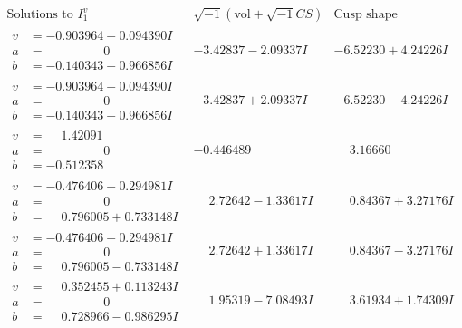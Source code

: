 \documentclass[1p]{elsarticle_modified}
\theoremstyle{definition}
\newcommand{\I}{\sqrt{-1}}
\begin{document}
$$\begin{array}{c|c|c}  
\text{Solutions to }I^v_{1}& \I (\text{vol} + \sqrt{-1}CS) & \text{Cusp shape}\\
 \hline 
\begin{aligned}
v &= -0.903964 + 0.094390 I \\
a &= \phantom{-0.000000 } 0 \\
b &= -0.140343 + 0.966856 I\end{aligned}
 & -3.42837 - 2.09337 I & -6.52230 + 4.24226 I \\ \hline\begin{aligned}
v &= -0.903964 - 0.094390 I \\
a &= \phantom{-0.000000 } 0 \\
b &= -0.140343 - 0.966856 I\end{aligned}
 & -3.42837 + 2.09337 I & -6.52230 - 4.24226 I \\ \hline\begin{aligned}
v &= \phantom{-}1.42091\phantom{ +0.000000I} \\
a &= \phantom{-0.000000 } 0 \\
b &= -0.512358\phantom{ +0.000000I}\end{aligned}
 & -0.446489\phantom{ +0.000000I} & \phantom{-}3.16660\phantom{ +0.000000I} \\ \hline\begin{aligned}
v &= -0.476406 + 0.294981 I \\
a &= \phantom{-0.000000 } 0 \\
b &= \phantom{-}0.796005 + 0.733148 I\end{aligned}
 & \phantom{-}2.72642 - 1.33617 I & \phantom{-}0.84367 + 3.27176 I \\ \hline\begin{aligned}
v &= -0.476406 - 0.294981 I \\
a &= \phantom{-0.000000 } 0 \\
b &= \phantom{-}0.796005 - 0.733148 I\end{aligned}
 & \phantom{-}2.72642 + 1.33617 I & \phantom{-}0.84367 - 3.27176 I \\ \hline\begin{aligned}
v &= \phantom{-}0.352455 + 0.113243 I \\
a &= \phantom{-0.000000 } 0 \\
b &= \phantom{-}0.728966 - 0.986295 I\end{aligned}
 & \phantom{-}1.95319 - 7.08493 I & \phantom{-}3.61934 + 1.74309 I \\ \hline\begin{aligned}

\end{aligned}
\end{array}$$
\end{document}
